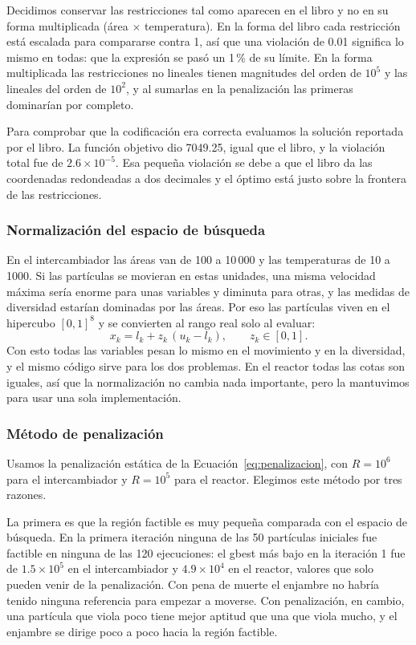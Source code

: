 Decidimos conservar las restricciones tal como aparecen en el libro y no en su forma multiplicada (área $\times$ temperatura). En la forma del libro cada restricción está escalada para compararse contra 1, así que una violación de 0.01 significa lo mismo en todas: que la expresión se pasó un 1\,\% de su límite. En la forma multiplicada las restricciones no lineales tienen magnitudes del orden de $10^5$ y las lineales del orden de $10^2$, y al sumarlas en la penalización las primeras dominarían por completo.

Para comprobar que la codificación era correcta evaluamos la solución reportada por el libro. La función objetivo dio 7049.25, igual que el libro, y la violación total fue de $2.6 \times 10^{-5}$. Esa pequeña violación se debe a que el libro da las coordenadas redondeadas a dos decimales y el óptimo está justo sobre la frontera de las restricciones.

\subsubsection{Normalización del espacio de búsqueda}

En el intercambiador las áreas van de 100 a 10\,000 y las temperaturas de 10 a 1000. Si las partículas se movieran en estas unidades, una misma velocidad máxima sería enorme para unas variables y diminuta para otras, y las medidas de diversidad estarían dominadas por las áreas. Por eso las partículas viven en el hipercubo $[0,1]^8$ y se convierten al rango real solo al evaluar:
\begin{equation}
x_k = l_k + z_k\,(u_k - l_k), \qquad z_k \in [0, 1].
\end{equation}
Con esto todas las variables pesan lo mismo en el movimiento y en la diversidad, y el mismo código sirve para los dos problemas. En el reactor todas las cotas son iguales, así que la normalización no cambia nada importante, pero la mantuvimos para usar una sola implementación.

\subsubsection{Método de penalización}

Usamos la penalización estática de la Ecuación~\eqref{eq:penalizacion}, con $R = 10^6$ para el intercambiador y $R = 10^5$ para el reactor. Elegimos este método por tres razones.

La primera es que la región factible es muy pequeña comparada con el espacio de búsqueda. En la primera iteración ninguna de las 50 partículas iniciales fue factible en ninguna de las 120 ejecuciones: el gbest más bajo en la iteración 1 fue de $1.5 \times 10^5$ en el intercambiador y $4.9 \times 10^4$ en el reactor, valores que solo pueden venir de la penalización. Con pena de muerte el enjambre no habría tenido ninguna referencia para empezar a moverse. Con penalización, en cambio, una partícula que viola poco tiene mejor aptitud que una que viola mucho, y el enjambre se dirige poco a poco hacia la región factible.

